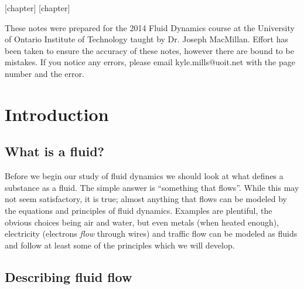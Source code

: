 \documentclass[12pt]{book}
\begin{document}
\clearpage \mbox{}
\thispagestyle{empty}

\newpage

[chapter]
[chapter]

\vspace*{10em}
These notes were prepared for the 2014 Fluid Dynamics course at the University of Ontario Institute of Technology taught by Dr. Joseph MacMillan.  Effort has been taken to ensure the accuracy of these notes, however there are bound to be mistakes. If you notice any errors, please email {kyle.mills@uoit.net} with the page number and the error.
\vfill
\clearpage


\newpage
\tableofcontents
\newpage
\chapter{Introduction}
\section{What is a fluid?}
Before we begin our study of fluid dynamics we should look at what defines a substance as a fluid.  The simple answer is ``something that flows''.  While this may not seem satisfactory, it is true; almost anything that flows can be modeled by the equations and principles of fluid dynamics.  Examples are plentiful, the obvious choices being air and water, but even metals (when heated enough), electricity (electrons \textit{flow} through wires) and traffic flow can be modeled as fluids and follow at least some of the principles which we will develop.


\section{Describing fluid flow}
\end{document}
